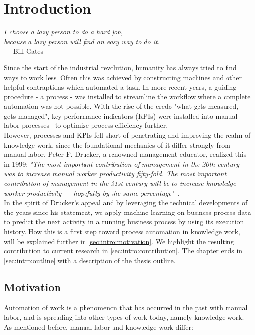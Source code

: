 \chapter{Introduction}\label{sec:intro}
\begin{flushright}{\slshape
I choose a lazy person to do a hard job,\\
because a lazy person will find an easy way to do it.}\\
\medskip
--- Bill Gates
\end{flushright}

\noindent Since the start of the industrial revolution, humanity has always tried to find ways to work less. Often this was achieved by constructing machines and other helpful contraptions which automated a task. In more recent years, a guiding procedure - a process - was installed to streamline the workflow where a complete automation was not possible. With the rise of the credo "what gets measured, gets managed", key performance indicators (KPIs) were installed into manual labor processes~\cite{web:taylorism-and-drucker} to optimize process efficiency further.\\

However, processes and KPIs fell short of penetrating and improving the realm of knowledge work, since the foundational mechanics of it differ strongly from manual labor. Peter F. Drucker, a renowned management educator, realized this in 1999:
{\slshape"The most important contribution of management in the 20th century was to increase manual worker productivity fifty-fold. The most important contribution of management in the 21st century will be to increase knowledge worker productivity — hopefully by the same percentage"}~\cite{drucker1999}.\\

In the spirit of Drucker's appeal and by leveraging the technical developments of the years since his statement, we apply machine learning on business process data to predict the next activity in a running business process by using its execution history. How this is a first step toward process automation in knowledge work, will be explained further in \autoref{sec:intro:motivation}.  We highlight the resulting contribution to current research in \autoref{sec:intro:contribution}. The chapter ends in \autoref{sec:intro:outline} with a description of the thesis outline.

\section{Motivation} \label{sec:intro:motivation}
Automation of work is a phenomenon that has occurred in the past with manual labor, and is spreading into other types of work today, namely knowledge work. As mentioned before, manual labor and knowledge work differ:

